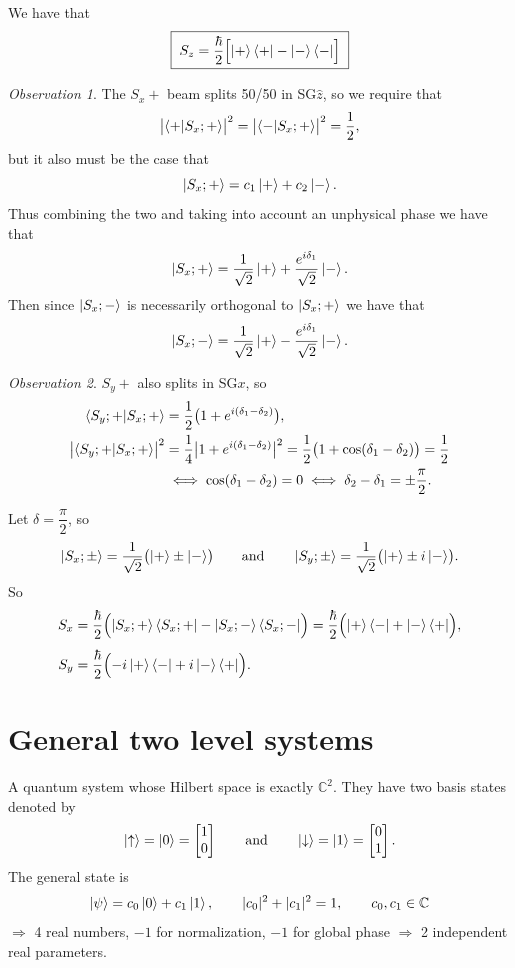 \documentclass[12pt]{article}
\theoremstyle{plain}
\theoremstyle{remark}
\newtheorem*{observation}{Observation}
\newcommand{\C}{\mathbb{C}}
\newcommand{\hbf}[1]{\hat{#1}}
\begin{document}
We have that
\[
  \boxed{\; S_z = \frac{\hbar}{2}\Bigl[\ket{+}\bra{+} - \ket{-}\bra{-}\Bigr] \;}
\]

\begin{observation}
The $S_x+$ beam splits 50/50 in SG$\hbf{z}$, so we require that
\[
  \bigl|\braket{+|S_x;+}\bigr|^2 = \bigl|\braket{-|S_x;+}\bigr|^2 = \frac12 ,
\]
but it also must be the case that
\[
  \ket{S_x;+} = c_1\ket{+} + c_2\ket{-} .
\]
Thus combining the two and taking into account an unphysical phase we have that
\[
  \ket{S_x;+} = \frac{1}{\sqrt2}\ket{+} + \frac{e^{i\delta_1}}{\sqrt2}\ket{-} .
\]
Then since $\ket{S_x;-}$ is necessarily orthogonal to $\ket{S_x;+}$ we have that
\[
  \ket{S_x;-} = \frac{1}{\sqrt2}\ket{+} - \frac{e^{i\delta_1}}{\sqrt2}\ket{-} .
\]
\end{observation}

\begin{observation}
$S_y+$ also splits in SG$x$, so
\begin{align*}
  \braket{S_y;+|S_x;+} &= \frac12\bigl(1 + e^{i(\delta_1-\delta_2)}\bigr) , \\
  \bigl|\braket{S_y;+|S_x;+}\bigr|^2 &= \frac14\bigl|1 + e^{i(\delta_1-\delta_2)}\bigr|^2
    = \frac12\bigl(1 + \cos(\delta_1-\delta_2)\bigr) = \frac12 \\
  &\iff \cos(\delta_1-\delta_2) = 0 \iff \delta_2 - \delta_1 = \pm\frac{\pi}{2} .
\end{align*}
\end{observation}

Let $\delta = \dfrac{\pi}{2}$, so
\[
  \ket{S_x;\pm} = \frac{1}{\sqrt2}\bigl(\ket{+} \pm \ket{-}\bigr)
  \qquad\text{and}\qquad
  \ket{S_y;\pm} = \frac{1}{\sqrt2}\bigl(\ket{+} \pm i\ket{-}\bigr) .
\]
So
\begin{align*}
  S_x &= \frac{\hbar}{2}\Bigl(\ket{S_x;+}\bra{S_x;+} - \ket{S_x;-}\bra{S_x;-}\Bigr)
       = \frac{\hbar}{2}\Bigl(\ket{+}\bra{-} + \ket{-}\bra{+}\Bigr) , \\[4pt]
  S_y &= \frac{\hbar}{2}\Bigl(-i\ket{+}\bra{-} + i\ket{-}\bra{+}\Bigr) .
\end{align*}

\section{General two level systems}

A quantum system whose Hilbert space is exactly $\C^2$. They have two basis states denoted by
\[
  \ket{\uparrow} = \ket{0} = \begin{bmatrix} 1 \\ 0 \end{bmatrix}
  \qquad\text{and}\qquad
  \ket{\downarrow} = \ket{1} = \begin{bmatrix} 0 \\ 1 \end{bmatrix} .
\]
The general state is
\[
  \ket{\psi} = c_0\ket{0} + c_1\ket{1}, \qquad |c_0|^2 + |c_1|^2 = 1, \qquad c_0, c_1 \in \C
\]
$\Rightarrow$ 4 real numbers, $-1$ for normalization, $-1$ for global phase $\Rightarrow$ 2 independent real parameters.
\end{document}
